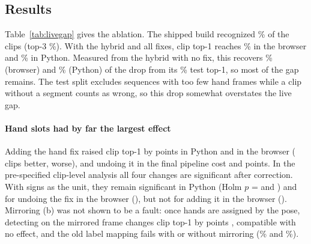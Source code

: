 \subsection{Results}
\label{sec:liveresults}



Table~\ref{tab:livegap} gives the ablation. The shipped build recognized
\% of the clips (top-3 \%). With the hybrid
and all fixes, clip top-1 reaches \%  in the
browser and \%  in Python. Measured from the hybrid
with no fix, this recovers \% (browser) and \% (Python) of the
drop from its \% test top-1, so most of the gap remains. The test split excludes
sequences with too few hand frames while a clip without a segment counts as wrong, so this drop
somewhat overstates the live gap.

\paragraph*{Hand slots had by far the largest effect}
Adding the hand fix raised clip top-1 by  points in Python and
 in the browser ( clips better,
 worse), and undoing it in the final pipeline cost
 and  points. In the pre-specified clip-level analysis
all four changes are significant after correction. With signs as the unit, they remain significant
in Python (Holm $p$ =  and ) and for undoing
the fix in the browser (), but not for adding it in the browser
(). Mirroring (b) was not shown to be a fault: once hands are
assigned by the pose, detecting on the mirrored frame changes clip top-1 by
 points , compatible with no effect, and the
old label mapping fails with or without mirroring (\% and
\%).

